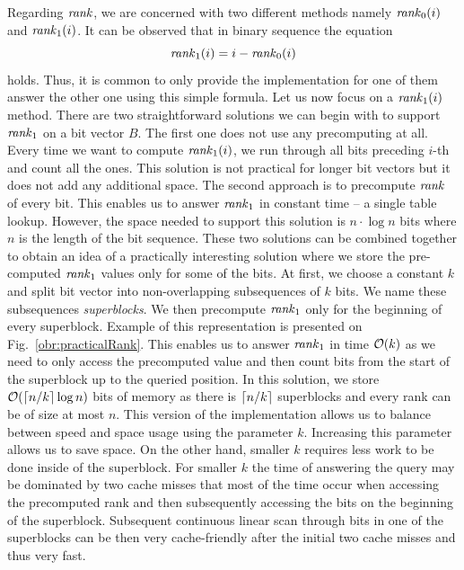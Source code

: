 Regarding $\mathit{rank}$, we are concerned with two different methods namely $\mathit{rank}_0(i)$
and $\mathit{rank}_1(i)$. It can be observed that in binary sequence the equation
$$\mathit{rank}_1(i) = i - \mathit{rank}_0(i)$$ holds. Thus, it is common to only provide
the implementation for one of them answer the other one using this simple formula.
Let us now focus on a $\mathit{rank}_1(i)$ method. There are two
straightforward solutions we can begin with to support $\mathit{rank}_1$ on a bit vector
$B$. The first one does not use any precomputing at all. Every time we want
to compute $\mathit{rank}_1(i)$, we run through all bits preceding $i$-th and count all
the ones. This solution is not practical for longer bit vectors but it does not
add any additional space. The second approach is to precompute $\mathit{rank}$ of every
bit. This enables us to answer $\mathit{rank}_1$ in constant time -- a single table lookup.
However, the space needed to support this solution is $n\cdot\log n$ bits where
$n$ is the length of the bit sequence. These two solutions can be combined together
to obtain an idea of a practically interesting solution where we store the pre-computed
$\mathit{rank}_1$ values only for some of the bits. At first, we choose a constant $k$ and split
bit vector into non-overlapping subsequences of $k$
bits. We name these subsequences \textit{superblocks}. We then precompute $\mathit{rank}_1$
only for the beginning of every superblock. Example of this representation is presented on
Fig.~\ref{obr:practicalRank}. This enables us to answer $\mathit{rank}_1$ in time $\mathcal{O}(k)$
as we need to only access the precomputed value and then count bits from the start of the
superblock up to the queried position. In this solution, we store $\mathcal{O}(\left\lceil n/k \right\rceil\log n)$
bits of memory as there is $\left\lceil n/k \right\rceil$ superblocks and every rank can be of size at most $n$.
This version of the implementation allows us to balance between speed and space usage using the
parameter $k$. Increasing this parameter allows us to save space. On the other hand, smaller $k$
requires less work to be done inside of the superblock. For smaller $k$ the time of answering
the query may be dominated by two cache misses that most of the time occur when accessing the
precomputed rank and then subsequently accessing the bits on the beginning of the superblock.
Subsequent continuous linear scan through bits in one of the superblocks can be then very
cache-friendly after the initial two cache misses and thus very fast.

